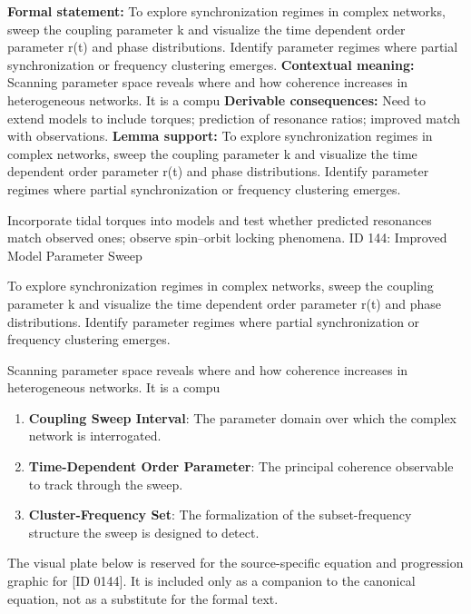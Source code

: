 \begingroup\footnotesize\setlength{\emergencystretch}{3em}\sloppy
\textbf{Formal statement:} To explore synchronization regimes in complex networks, sweep the coupling parameter k  and visualize the time dependent order parameter r(t) and phase distributions. Identify parameter regimes where partial synchronization or frequency clustering emerges.
\textbf{Contextual meaning:} Scanning parameter space reveals where and how coherence increases in heterogeneous networks. It is a compu
\textbf{Derivable consequences:} Need to extend models to include torques; prediction of resonance ratios; improved match with observations.
\textbf{Lemma support:} To explore synchronization regimes in complex networks, sweep the coupling parameter k  and visualize the time dependent order parameter r(t) and phase distributions. Identify parameter regimes where partial synchronization or frequency clustering emerges.\par
\endgroup

Incorporate tidal torques into models and test whether predicted resonances match observed ones; observe spin--orbit locking phenomena. ID 144: Improved Model Parameter Sweep

To explore synchronization regimes in complex networks, sweep the coupling parameter k  and visualize the time dependent order parameter r(t) and phase distributions. Identify parameter regimes where partial synchronization or frequency clustering emerges.

Scanning parameter space reveals where and how coherence increases in heterogeneous networks. It is a compu
\endgroup

\begin{enumerate}[leftmargin=1.6em,itemsep=6pt,topsep=4pt]
\item \textbf{Coupling Sweep Interval}: The parameter domain over which the complex network is interrogated.
\item \textbf{Time-Dependent Order Parameter}: The principal coherence observable to track through the sweep.
\item \textbf{Cluster-Frequency Set}: The formalization of the subset-frequency structure the sweep is designed to detect.
\end{enumerate}

\begingroup\footnotesize\sloppy
The visual plate below is reserved for the source-specific equation and progression graphic for [ID 0144]. It is included only as a companion to the canonical equation, not as a substitute for the formal text.
\par\endgroup
\ifTZPDarkEdition
{}
\fi

